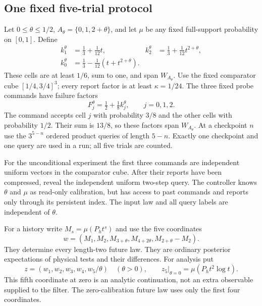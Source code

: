 \documentclass[11pt]{amsart}
\theoremstyle{definition}\newtheorem{definition}[theorem]{Definition}
\theoremstyle{remark}\newtheorem{remark}[theorem]{Remark}
\begin{document}
\subsection{One fixed five-trial protocol}
Let $0\le\theta\le1/2$, $A_\theta=\{0,1,2+\theta\}$, and let $\mu$
be any fixed full-support probability on $[0,1]$. Define
\begin{equation}\label{eq:near-collision-cells}
 \begin{aligned}
 k_1^\theta&=\tfrac13+\tfrac1{12}t,&
 k_2^\theta&=\tfrac13+\tfrac1{12}t^{2+\theta},\\
 k_0^\theta&=\tfrac13-\tfrac1{12}(t+t^{2+\theta}).
 \end{aligned}
\end{equation}
These cells are at least $1/6$, sum to one, and span $W_{A_\theta}$.
Use the fixed comparator cube $[1/4,3/4]^3$; every report factor is at
least $\kappa=1/24$. The three fixed probe commands have failure factors
\begin{equation}\label{eq:common-near-probes}
 F_j^\theta=\tfrac12+\tfrac18 k_j^\theta,\qquad j=0,1,2.
\end{equation}
The command accepts cell $j$ with probability $3/8$ and the other cells
with probability $1/2$. Their sum is $13/8$, so these factors span
$W_{A_\theta}$. At a checkpoint $n$ use the $3^{5-n}$ ordered product
queries of length $5-n$. Exactly one checkpoint and one query are used
in a run; all five trials are counted.

For the unconditional experiment the first three commands are independent
uniform vectors in the comparator cube. After their reports have been
compressed, reveal the independent uniform two-step query. The controller
knows $\theta$ and $\mu$ as read-only calibration, but has access to past
commands and reports only through its persistent index. The input law and
all query labels are independent of $\theta$.

For a history write $M_s=\mu(P_h t^s)$ and use the five coordinates
\begin{equation}\label{eq:five-physical-coordinates}
 w=(M_1,M_2,M_{3+\theta},M_{4+2\theta},M_{2+\theta}-M_2).
\end{equation}
They determine every length-two future law. They are ordinary posterior
expectations of physical tests and their differences. For analysis put
\begin{equation}\label{eq:five-desingularized}
 z=(w_1,w_2,w_3,w_4,w_5/\theta)\quad(\theta>0),
 \qquad z_5\big|_{\theta=0}=\mu(P_h t^2\log t).
\end{equation}
This fifth coordinate at zero is an analytic continuation, not an extra
observable supplied to the filter. The zero-calibration future law uses
only the first four coordinates.
\end{document}
